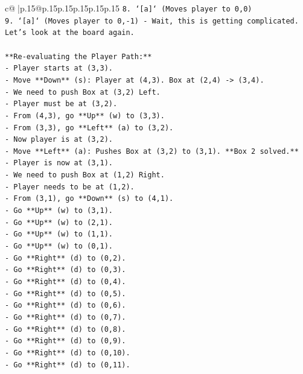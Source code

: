 \documentclass{article}
\begin{document}
{\begin{supertabular}{c@{$\;$}|p{.15\linewidth}@{}p{.15\linewidth}p{.15\linewidth}p{.15\linewidth}p{.15\linewidth}p{.15\linewidth}}
{{{\texttt{8.  `{[}a{]}` (Moves player to 0,0)} \\
\texttt{9.  `{[}a{]}` (Moves player to 0,{-}1) {-} Wait, this is getting complicated. Let's look at the board again.} \\
\\ 
\texttt{**Re{-}evaluating the Player Path:**} \\
\texttt{{-} Player starts at (3,3).} \\
\texttt{{-} Move **Down** (s): Player at (4,3). Box at (2,4) {-}> (3,4).} \\
\texttt{{-} We need to push Box at (3,2) Left.} \\
\texttt{{-} Player must be at (3,2).} \\
\texttt{{-} From (4,3), go **Up** (w) to (3,3).} \\
\texttt{{-} From (3,3), go **Left** (a) to (3,2).} \\
\texttt{{-} Now player is at (3,2).} \\
\texttt{{-} Move **Left** (a): Pushes Box at (3,2) to (3,1). **Box 2 solved.**} \\
\texttt{{-} Player is now at (3,1).} \\
\texttt{{-} We need to push Box at (1,2) Right.} \\
\texttt{{-} Player needs to be at (1,2).} \\
\texttt{{-} From (3,1), go **Down** (s) to (4,1).} \\
\texttt{{-} Go **Up** (w) to (3,1).} \\
\texttt{{-} Go **Up** (w) to (2,1).} \\
\texttt{{-} Go **Up** (w) to (1,1).} \\
\texttt{{-} Go **Up** (w) to (0,1).} \\
\texttt{{-} Go **Right** (d) to (0,2).} \\
\texttt{{-} Go **Right** (d) to (0,3).} \\
\texttt{{-} Go **Right** (d) to (0,4).} \\
\texttt{{-} Go **Right** (d) to (0,5).} \\
\texttt{{-} Go **Right** (d) to (0,6).} \\
\texttt{{-} Go **Right** (d) to (0,7).} \\
\texttt{{-} Go **Right** (d) to (0,8).} \\
\texttt{{-} Go **Right** (d) to (0,9).} \\
\texttt{{-} Go **Right** (d) to (0,10).} \\
\texttt{{-} Go **Right** (d) to (0,11).} \\
}}}
\end{supertabular}}
\end{document}
